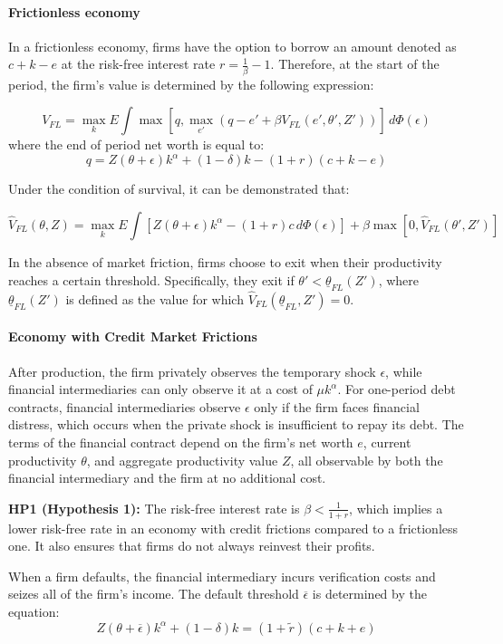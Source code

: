 \documentclass[12pt]{report}
\begin{document}
\paragraph{Frictionless economy}
In a frictionless economy, firms have the option to borrow an amount denoted as \(c+k-e\) at the risk-free interest rate
\(r=\frac{1}{\beta}-1\). Therefore, at the start of the period, the firm's value is determined by the following
expression:

\[V_{FL} = \max_{k} E \int \max[q,\max_{e'}(q - e' + \beta V_{FL}(e',\theta', Z'))]  \,d\Phi
(\epsilon) \]
where the end of period net worth is equal to:
\[q=Z(\theta+\epsilon)k^\alpha + (1-\delta )k-(1+r)(c+k-e)\]

Under the condition of survival, it can be demonstrated that:

\[\widehat{V}_{FL}(\theta,Z) = \max_{k}E\int[Z(\theta+\epsilon)k^\alpha - (1+r)c\,d\Phi (\epsilon)] +
\beta\max[0,\widehat{V}_{FL}(\theta',Z')]\]

In the absence of market friction, firms choose to exit when their productivity reaches a certain threshold.
Specifically, they exit if \(\theta'<\underline{\theta} _{FL}(Z')\), where \(\underline{\theta}
_{FL}(Z')\) is defined as the value
for which \(\widehat{V}_{FL}(\underline{\theta}_{FL},Z')=0\).

\paragraph{Economy with Credit Market Frictions}

After production, the firm privately observes the temporary shock $\epsilon$, while financial intermediaries can only
observe it at a cost of $\mu k^\alpha$. For one-period debt contracts, financial intermediaries observe $\epsilon$ only
if the firm faces financial distress, which occurs when the private shock is insufficient to repay its debt. The terms
of the financial contract depend on the firm's net worth $e$, current productivity $\theta$, and aggregate productivity
value $Z$, all observable by both the financial intermediary and the firm at no additional cost.

\textbf{HP1 (Hypothesis 1):} The risk-free interest rate is $\beta < \frac{1}{1+r}$, which implies a lower risk-free
rate in an economy with credit frictions compared to a frictionless one. It also ensures that firms do not always
reinvest their profits.

When a firm defaults, the financial intermediary incurs verification costs and seizes all of the firm's income. The
default threshold $\overline{\epsilon}$ is determined by the equation:
\[
Z(\theta+\overline{\epsilon})k^\alpha + (1-\delta)k = (1+\widetilde{r} )(c+k+e)
\]
\end{document}
